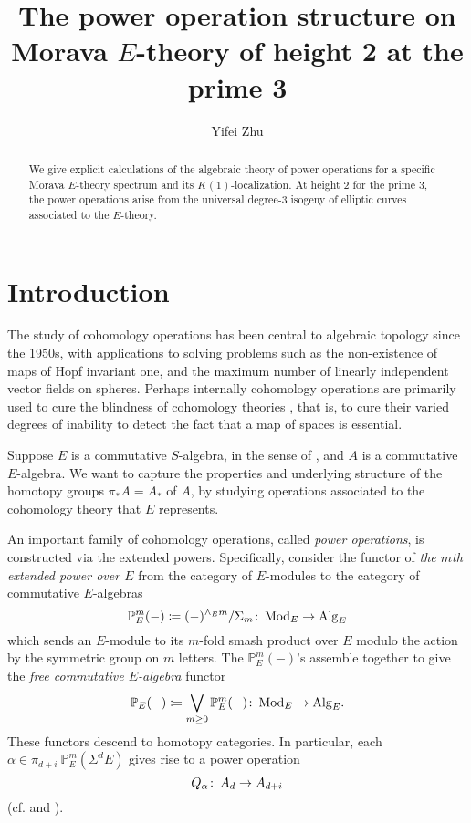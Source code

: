 \documentclass{gtpart}
\title{The power operation structure on Morava $E$-theory of height 2 at the prime 3}
\author{Yifei Zhu}
\theoremstyle{definition}
\theoremstyle{remark}
\def\co{\colon\thinspace}
\newcommand{\mb}[1]{\mathbb{#1}}
\newcommand{\Mod}{{\rm Mod}}
\newcommand{\Alg}{{\rm Alg}}
\newcommand{\cf}{cf.\thinspace}
\newcommand{\BP}{{\mb P}}
\newcommand{\A}{\alpha}
\begin{document}
\begin{abstract}
 We give explicit calculations of the algebraic theory of power operations for a specific Morava $E$-theory spectrum and its $K(1)$-localization.  
 At height 2 for the prime 3, the power operations arise from the universal degree-3 isogeny of elliptic curves associated to the $E$-theory.  
\end{abstract}


\maketitle
\section{Introduction}

The study of cohomology operations has been central to algebraic topology 
since the 1950s, with applications to solving problems such as the non-existence of maps of Hopf invariant one, 
and the maximum number of linearly independent vector fields on spheres.  
Perhaps internally cohomology operations are primarily used to cure the blindness of cohomology theories \cite{blind}, 
that is, to cure their varied degrees of inability to detect the fact that a map of spaces is essential.  

Suppose $E$ is a commutative $S$-algebra, in the sense of \cite{EKMM}, and $A$ is a commutative $E$-algebra.  
We want to capture the properties and underlying structure of the homotopy groups $\pi_* A = A_*$ of $A$, 
by studying operations associated to the cohomology theory that $E$ represents.  

An important family of cohomology operations, called {\em power operations}, is constructed via the extended powers.  
Specifically, consider the functor of {\em the $m$th extended power over $E$} from the category of $E$-modules to the category of commutative $E$-algebras 
\[
 \BP_E^m (-) \coloneqq (-)^{\wedge_E m} / \Sigma_m \co \Mod_E \to \Alg_E 
\]
which sends an $E$-module to its $m$-fold smash product over $E$ modulo the action by the symmetric group on $m$ letters.  
The $\BP_E^m (-)$'s assemble together to give the {\em free commutative $E$-algebra} functor 
\[
 \BP_E (-) \coloneqq \bigvee_{m \geq 0} \BP_E^m (-) \co \Mod_E \to \Alg_E.  
\]
These functors descend to homotopy categories.  
In particular, each $\A \in \pi_{d+i}~\BP_E^m (\Sigma^d E)$ gives rise to a power operation 
\[
 Q_\A \co A_d \to A_{d+i} 
\]
(\cf \cite[Sections I.2 and IX.1]{H_infty} and \cite[Section 3]{cong}).  
\end{document}
